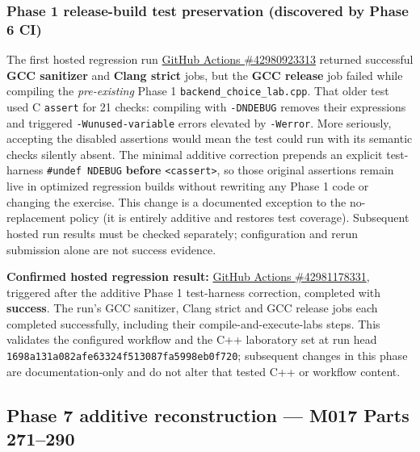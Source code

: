 \subsubsection{Phase 1 release-build test preservation (discovered by Phase 6 CI)}\label{appendix-a103e7846d21-phase-1-release-build-test-preservation-discovered-by-phase-6-ci}

The first hosted regression run \href{https://github.com/swayam8624/Project_008_AllMight/actions/runs/42980923313}{GitHub Actions \#42980923313} returned successful \textbf{GCC sanitizer} and \textbf{Clang strict} jobs, but the \textbf{GCC release} job failed while compiling the \emph{pre-existing} Phase 1 \texttt{backend\_choice\_lab.cpp}. That older test used C \texttt{assert} for 21 checks: compiling with \texttt{-DNDEBUG} removes their expressions and triggered \texttt{-Wunused-variable} errors elevated by \texttt{-Werror}. More seriously, accepting the disabled assertions would mean the test could run with its semantic checks silently absent. The minimal additive correction prepends an explicit test-harness \texttt{\#undef\ NDEBUG} \textbf{before} \texttt{\textless{}cassert\textgreater{}}, so those original assertions remain live in optimized regression builds without rewriting any Phase 1 code or changing the exercise. This change is a documented exception to the no-replacement policy (it is entirely additive and restores test coverage). Subsequent hosted run results must be checked separately; configuration and rerun submission alone are not success evidence.

\textbf{Confirmed hosted regression result:} \href{https://github.com/swayam8624/Project_008_AllMight/actions/runs/42981178331}{GitHub Actions \#42981178331}, triggered after the additive Phase 1 test-harness correction, completed with \textbf{success}. The run's GCC sanitizer, Clang strict and GCC release jobs each completed successfully, including their compile-and-execute-labs steps. This validates the configured workflow and the C++ laboratory set at run head \texttt{1698a131a082afe63324f513087fa5998eb0f720}; subsequent changes in this phase are documentation-only and do not alter that tested C++ or workflow content.

\subsection{Phase 7 additive reconstruction --- M017 Parts 271--290}\label{appendix-a103e7846d21-phase-7-additive-reconstruction-m017-parts-271290}

